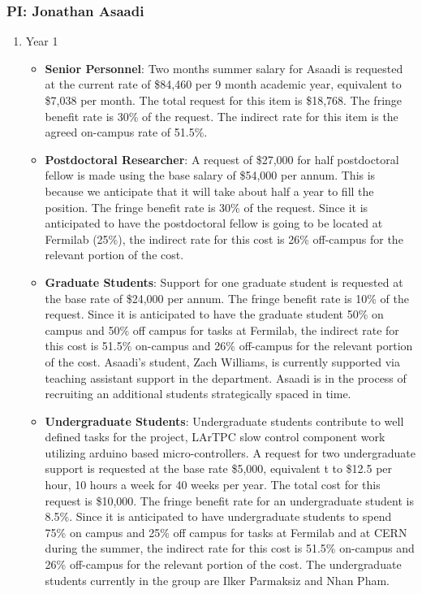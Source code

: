\newpage

\subsubsection{\bf PI: Jonathan Asaadi}

\begin{enumerate}

\item{Year 1}

\begin{itemize}[noitemsep,nolistsep]

\item{{\bf Senior Personnel}: Two months summer salary for Asaadi is requested at the current rate of \$84,460 per 9 month academic year, equivalent to \$7,038 per month.  The total request for this item is \$18,768.   The fringe benefit rate is 30\% of the request.  The indirect rate for this item is the agreed on-campus rate of 51.5\%.}

\item {{\bf Postdoctoral Researcher}: A request of \$27,000 for half postdoctoral fellow is made using the base salary of \$54,000 per annum. This is because we anticipate that it will take about half a year to fill the position.  The fringe benefit rate is 30\% of the request.  Since it is anticipated to have the postdoctoral fellow is going to be located at Fermilab (25\%), the indirect rate for this cost is 26\% off-campus for the relevant portion of the cost.} 

\item{{\bf Graduate Students}: Support for one graduate student is requested at the base rate of \$24,000 per annum.   The fringe benefit rate is 10\% of the request.  Since it is anticipated to have the graduate student 50\% on campus and 50\% off campus for tasks at Fermilab, the indirect rate for this cost is 51.5\% on-campus and 26\% off-campus for the relevant portion of the cost.   Asaadi’s student, Zach Williams, is currently supported via teaching assistant support in the department.   Asaadi is in the process of recruiting an additional students strategically spaced in time.}

\item {{\bf Undergraduate Students}: Undergraduate students contribute to well defined tasks for the project, LArTPC slow control component work utilizing arduino based micro-controllers.  A request for two undergraduate support is requested at the base rate \$5,000, equivalent t to \$12.5 per hour, 10 hours a week for 40 weeks per year.  The total cost for this request is \$10,000.  The fringe benefit rate for an undergraduate student is 8.5\%.  Since it is anticipated to have undergraduate students to spend 75\% on campus and 25\% off campus for tasks at Fermilab and at CERN during the summer, the indirect rate for this cost is 51.5\% on-campus and 26\% off-campus for the relevant portion of the cost.   The undergraduate students currently in the group are Ilker Parmaksiz and Nhan Pham.}


\end{itemize}
\end{enumerate}

